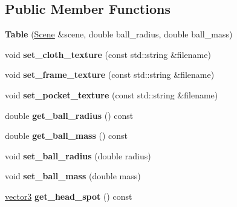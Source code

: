 \subsection*{Public Member Functions}
\begin{DoxyCompactItemize}
\item 
\hypertarget{class_table_af6d9089256f0d1192d3f4b4cb4116c54}{
{\bfseries Table} (\hyperlink{class_scene}{Scene} \&scene, double ball\_\-radius, double ball\_\-mass)}
\label{class_table_af6d9089256f0d1192d3f4b4cb4116c54}

\item 
\hypertarget{class_table_af1c2df3909f4a2bb2c2d0b42bffcee61}{
void {\bfseries set\_\-cloth\_\-texture} (const std::string \&filename)}
\label{class_table_af1c2df3909f4a2bb2c2d0b42bffcee61}

\item 
\hypertarget{class_table_ad30c099b36e513c2ae2caeb4aa1cd160}{
void {\bfseries set\_\-frame\_\-texture} (const std::string \&filename)}
\label{class_table_ad30c099b36e513c2ae2caeb4aa1cd160}

\item 
\hypertarget{class_table_a9d22cdab1775df11d4febda30f631c72}{
void {\bfseries set\_\-pocket\_\-texture} (const std::string \&filename)}
\label{class_table_a9d22cdab1775df11d4febda30f631c72}

\item 
\hypertarget{class_table_a96c20dc3d195b09b28c1470e725b55f4}{
double {\bfseries get\_\-ball\_\-radius} () const }
\label{class_table_a96c20dc3d195b09b28c1470e725b55f4}

\item 
\hypertarget{class_table_aeab43907218aa48cbd8863fd723424e7}{
double {\bfseries get\_\-ball\_\-mass} () const }
\label{class_table_aeab43907218aa48cbd8863fd723424e7}

\item 
\hypertarget{class_table_a9a7e2d43b731b9ce23f6f8eac5c4b752}{
void {\bfseries set\_\-ball\_\-radius} (double radius)}
\label{class_table_a9a7e2d43b731b9ce23f6f8eac5c4b752}

\item 
\hypertarget{class_table_aad9811a07656a9c7bfa05bbcab44f144}{
void {\bfseries set\_\-ball\_\-mass} (double mass)}
\label{class_table_aad9811a07656a9c7bfa05bbcab44f144}

\item 
\hypertarget{class_table_ae9637e8484c3768096ba03c34d610064}{
\hyperlink{classvector3d}{vector3} {\bfseries get\_\-head\_\-spot} () const }
\label{class_table_ae9637e8484c3768096ba03c34d610064}


\end{DoxyCompactItemize}
